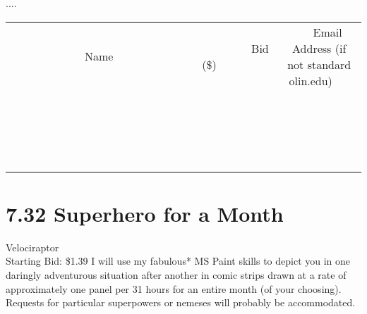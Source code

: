 \documentclass[11pt]{article}
\begin{document}
....
\\[3ex]
\begin{tabular}{c c c}
~~~~~~~~~~~~~Name~~~~~~~~~~~~~ & ~~~~~~~~~Bid (\$)~~~~~~~~~  & ~~~Email Address (if not standard olin.edu)~~~\\
 & & \\
\hline
 & & \\
\hline
 & & \\
\hline
 & & \\
\hline
 & & \\
\hline
 & & \\
\hline
 & & \\
\hline
 & & \\
\hline
 & & \\
\hline
 & & \\
\hline
 & & \\
\hline
 & & \\
\hline
 & & \\
\hline
 & & \\
\hline
 & & \\
\hline
 & & \\
\hline
 & & \\
\hline
 & & \\
\hline
 & & \\
\hline
\end{tabular}
\newpage
\section*{7.32 Superhero for a Month}
Velociraptor
\\
Starting Bid: \$1.39
\newline
I will use my fabulous* MS Paint skills to depict you in one daringly adventurous situation after another in comic strips drawn at a rate of approximately one panel per 31 hours for an entire month (of your choosing).  Requests for particular superpowers or nemeses will probably be accommodated.
\end{document}
